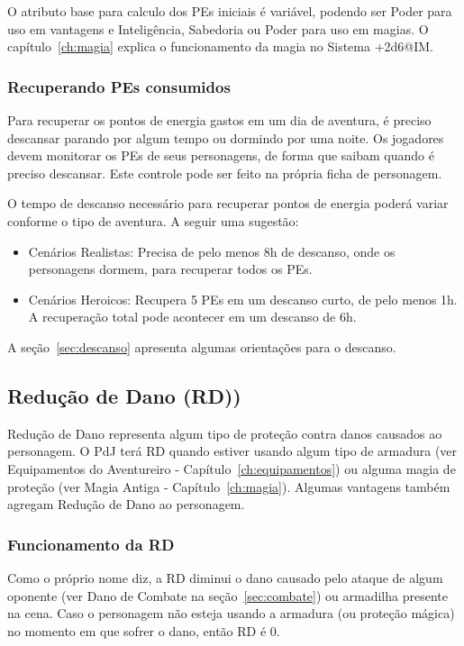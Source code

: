 O atributo base para calculo dos PEs iniciais é variável, podendo ser Poder para uso em vantagens e Inteligência, Sabedoria ou Poder para uso em magias. O capítulo~\ref{ch:magia} explica o funcionamento da magia no Sistema +2d6@IM.

\subsubsection*{Recuperando PEs consumidos}
Para recuperar os pontos de energia gastos em um dia de aventura, é preciso descansar parando por algum tempo ou dormindo por uma noite. Os jogadores devem monitorar os PEs de seus personagens, de forma que saibam quando é preciso descansar. Este controle pode ser feito na própria ficha de personagem. 

O tempo de descanso necessário para recuperar pontos de energia poderá variar conforme o tipo de aventura. A seguir uma sugestão:
\begin{itemize}
	\item Cenários Realistas: Precisa de pelo menos 8h de descanso, onde os personagens dormem, para recuperar todos os PEs.
	\item Cenários Heroicos: Recupera 5 PEs em um descanso curto, de pelo menos 1h. A recuperação total pode acontecer em um descanso de 6h.
\end{itemize}

A seção~\ref{sec:descanso} apresenta algumas orientações para o descanso.

\subsection{Redução de Dano (RD))}
Redução de Dano representa algum tipo de proteção contra danos causados ao personagem. O PdJ terá RD quando estiver usando algum tipo de armadura (ver Equipamentos do Aventureiro - Capítulo~\ref{ch:equipamentos}) ou alguma magia de proteção (ver Magia Antiga - Capítulo~\ref{ch:magia}). Algumas vantagens também agregam Redução de Dano ao personagem.

\subsubsection*{Funcionamento da RD}
Como o próprio nome diz, a RD diminui o dano causado pelo ataque de algum oponente (ver Dano de Combate na seção~\ref{sec:combate}) ou armadilha presente na cena. Caso o personagem não esteja usando a armadura (ou proteção mágica) no momento em que sofrer o dano, então RD é 0. 

